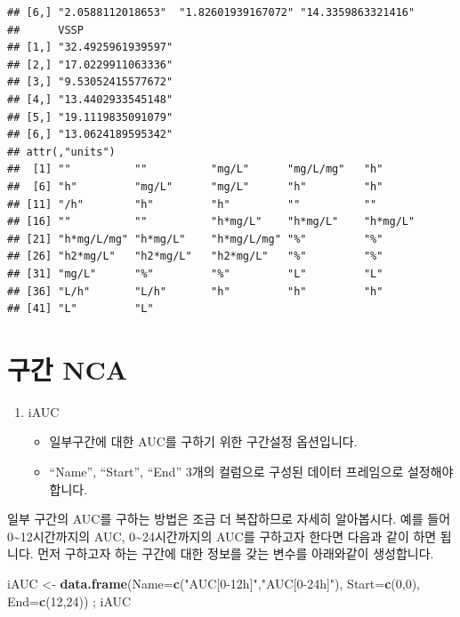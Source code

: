 \documentclass[12pt,]{krantz}
\newenvironment{Shaded}{\begin{snugshade}}{\end{snugshade}}
\newcommand{\KeywordTok}[1]{\textcolor[rgb]{0.13,0.29,0.53}{\textbf{#1}}}
\newcommand{\DataTypeTok}[1]{\textcolor[rgb]{0.13,0.29,0.53}{#1}}
\newcommand{\DecValTok}[1]{\textcolor[rgb]{0.00,0.00,0.81}{#1}}
\newcommand{\StringTok}[1]{\textcolor[rgb]{0.31,0.60,0.02}{#1}}
\newcommand{\NormalTok}[1]{#1}
\providecommand{\tightlist}{%
  \setlength{\itemsep}{0pt}\setlength{\parskip}{0pt}}
\theoremstyle{definition}
\theoremstyle{definition}
\theoremstyle{definition}
\theoremstyle{remark}
\begin{document}
\begin{verbatim}
## [6,] "2.0588112018653"  "1.82601939167072" "14.3359863321416"
##      VSSP              
## [1,] "32.4925961939597"
## [2,] "17.0229911063336"
## [3,] "9.53052415577672"
## [4,] "13.4402933545148"
## [5,] "19.1119835091079"
## [6,] "13.0624189595342"
## attr(,"units")
##  [1] ""          ""          "mg/L"      "mg/L/mg"   "h"        
##  [6] "h"         "mg/L"      "mg/L"      "h"         "h"        
## [11] "/h"        "h"         "h"         ""          ""         
## [16] ""          ""          "h*mg/L"    "h*mg/L"    "h*mg/L"   
## [21] "h*mg/L/mg" "h*mg/L"    "h*mg/L/mg" "%"         "%"        
## [26] "h2*mg/L"   "h2*mg/L"   "h2*mg/L"   "%"         "%"        
## [31] "mg/L"      "%"         "%"         "L"         "L"        
## [36] "L/h"       "L/h"       "h"         "h"         "h"        
## [41] "L"         "L"
\end{verbatim}

\section{구간 NCA}\label{interval-NCA}

\begin{enumerate}
\def\labelenumi{\arabic{enumi}.}
\tightlist
\item
  iAUC

  \begin{itemize}
  \tightlist
  \item
    일부구간에 대한 AUC를 구하기 위한 구간설정 옵션입니다.
  \item
    ``Name'', ``Start'', ``End'' 3개의 컬럼으로 구성된 데이터 프레임으로
    설정해야 합니다.
  \end{itemize}
\end{enumerate}

일부 구간의 AUC를 구하는 방법은 조금 더 복잡하므로 자세히 알아봅시다.
예를 들어 0\textasciitilde{}12시간까지의 AUC,
0\textasciitilde{}24시간까지의 AUC를 구하고자 한다면 다음과 같이 하면
됩니다. 먼저 구하고자 하는 구간에 대한 정보를 갖는 변수를 아래와같이
생성합니다.

\begin{Shaded}
\begin{Highlighting}[]
\NormalTok{iAUC <-}\StringTok{ }\KeywordTok{data.frame}\NormalTok{(}\DataTypeTok{Name=}\KeywordTok{c}\NormalTok{(}\StringTok{"AUC[0-12h]"}\NormalTok{,}\StringTok{"AUC[0-24h]"}\NormalTok{), }\DataTypeTok{Start=}\KeywordTok{c}\NormalTok{(}\DecValTok{0}\NormalTok{,}\DecValTok{0}\NormalTok{), }\DataTypeTok{End=}\KeywordTok{c}\NormalTok{(}\DecValTok{12}\NormalTok{,}\DecValTok{24}\NormalTok{)) ; iAUC}
\end{Highlighting}
\end{Shaded}
\end{document}
